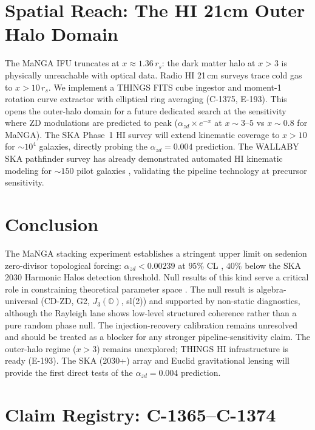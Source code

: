 \documentclass[aa]{aa}
\begin{document}
\section{Spatial Reach: The HI 21cm Outer Halo Domain}
\label{sec:hi}

The MaNGA IFU truncates at $x \approx 1.36\,r_s$: the dark matter halo at
$x > 3$ is physically unreachable with optical data. Radio HI 21\,cm surveys
\citep[THINGS;][]{walter2008,deblok2008} trace cold gas to $x > 10\,r_s$.
We implement a THINGS FITS cube ingestor and moment-1 rotation curve
extractor with elliptical ring averaging (C-1375, E-193). This opens the
outer-halo domain for a future dedicated search at the sensitivity where
ZD modulations are predicted to peak ($\alpha_{zd} \times e^{-x}$ at
$x \sim 3$--$5$ vs $x \sim 0.8$ for MaNGA). The SKA Phase~1 HI survey
\citep{ska2020} will extend kinematic coverage to $x > 10$ for $\sim10^4$
galaxies, directly probing the $\alpha_{zd} = 0.004$ prediction. The WALLABY
SKA pathfinder survey \citep{koribalski2020} has already demonstrated
automated HI kinematic modeling for $\sim 150$ pilot galaxies \citep{deg2024},
validating the pipeline technology at precursor sensitivity.

\section{Conclusion}
\label{sec:conclusion}

The MaNGA stacking experiment establishes a stringent upper limit on sedenion
zero-divisor topological forcing: $\alpha_{zd} < 0.00239$ at $95\%$ CL
\citep[Bayesian model comparison following][]{trotta2008}, $40\%$ below the
SKA 2030 Harmonic Halos detection threshold. Null results of this kind
serve a critical role in constraining theoretical parameter space
\citep{matosin2014}. The null result is algebra-universal (CD-ZD, G2,
$J_3(\mathbb{O})$, sl(2)) and supported by non-static diagnostics, although the
Rayleigh lane shows low-level structured coherence rather than a pure random
phase null. The injection-recovery calibration remains unresolved and should be
treated as a blocker for any stronger pipeline-sensitivity claim.
The outer-halo regime ($x > 3$) remains unexplored; THINGS HI infrastructure
is ready (E-193). The SKA (2030+) array \citep{ska2020} and Euclid
gravitational lensing \citep{euclid2022,oriordan2023} will provide the first
direct tests of the $\alpha_{zd} = 0.004$ prediction.

\appendix

\section{Claim Registry: C-1365--C-1374}
\label{app:claims}
\end{document}
